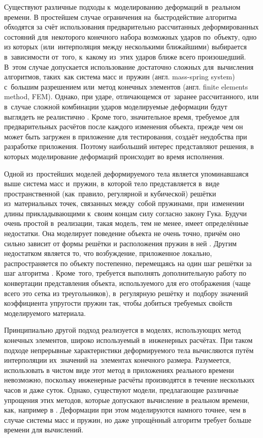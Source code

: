 \documentclass[a4paper, 14pt, titlepage]{extarticle}
\newcommand{\eng}[1]{{\English #1}}
\begin{document}
    Существуют различные подходы к~моделированию деформаций в~реальном времени. В простейшем случае
    ограничения на~быстродействие алгоритма обходятся за счёт использования предварительно рассчитанных
    деформированных состояний для~некоторого конечного набора возможных ударов по~объекту, одно из которых
    (или~интерполяция между несколькими ближайшими) выбирается в~зависимости от~того, к~какому
    из~этих ударов ближе всего произошедший. В~этом случае допускается использование достаточно сложных
    для~вычисления алгоритмов, таких~как система масс и~пружин (англ. \eng{mass-spring system})
    с~большим разрешением или~метод конечных элементов (англ. \eng{finite elements method, FEM}).
    Однако, при ударе, отличающемся от~заранее рассчитанного, или в~случае сложной комбинации ударов
    моделируемые деформации будут выглядеть не реалистично \cite[с.~1064]{chang-crash}. Кроме того, значительное время, требуемое
    для предварительных расчётов после каждого изменения объекта, прежде чем он может быть загружен
    в приложение для тестирования, создаёт неудобства при разработке приложения. Поэтому наибольший
    интерес представляют решения, в которых моделирование деформаций происходит во время исполнения.

    Одной из~простейших моделей деформируемого тела является упоминавшаяся выше система масс
    и~пружин, в~которой тело представляется в~виде пространственной (как~правило, регулярной и
    кубической) решётки из~материальных точек, связанных между~собой пружинами, при~изменении длины
    прикладывающими к~своим концам силу согласно закону Гука. Будучи очень простой в~реализации,
    такая модель, тем не менее, имеет определённые недостатки. Она моделирует поведение объекта не
    очень точно, причём оно сильно зависит от формы решётки и расположения пружин в ней \cite[с.~8]{mueller-physmodels}.
    Другим недостатком является то, что возбуждение, приложенное локально, распространяется по
    объекту постепенно, перемещаясь на один шаг решётки за шаг алгоритма \cite[с.~232]{parent-animation}.
    Кроме~того, требуется выполнять дополнительную работу по конвертации представления объекта,
    используемого для его отображения (чаще всего это сетка из треугольников), в~регулярную решётку
    и~подбору значений коэффициента упругости пружин так, чтобы добиться требуемых свойств
    моделируемого материала.

    Принципиально другой подход реализуется в моделях, использующих метод конечных элементов, широко
    используемый в~инженерных расчётах. При таком подходе
    непрерывные характеристики деформируемого тела вычисляются путём интерполяции их~значений
    на~элементах конечного размера. Разумеется, использовать в чистом виде этот метод
    в приложениях реального времени невозможно, поскольку инженерные расчёты производятся в
    течение нескольких часов и даже суток. Однако, существуют модели, предлагающие различные упрощения этих
    методов, которые допускают вычисление в реальном времени, как, например в \cite{mueller-stable}.
    Деформации при этом моделируются намного точнее, чем в случае системы масс и пружин, но даже
    упрощённый алгоритм требует больше времени для вычислений. %
\end{document}
